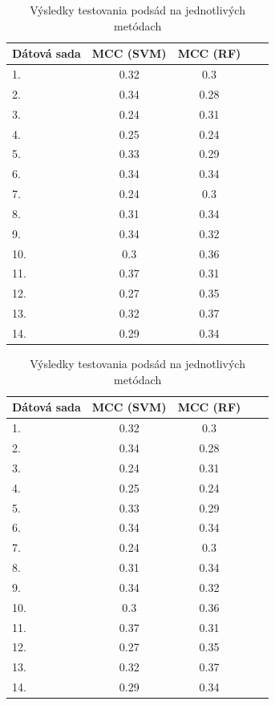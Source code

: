 \begin{table}[H]
	\centering
	\begin{tabular}{ |l | c | c | c | c|}
		\hline 
		Dátová sada  & MCC (SVM) & MCC (RF)  \\ \hline
		1. & 0.32 & 0.3\\ \hline
		2.  & 0.34 & 0.28\\ \hline
		3. & 0.24 & 0.31\\ \hline
		4.  & 0.25 & 0.24\\ \hline
		5.  & 0.33 & 0.29\\ \hline
		6.  & 0.34 & 0.34\\ \hline
		7. & 0.24 & 0.3\\ \hline
		8.  & 0.31 & 0.34\\ \hline
		9.  & 0.34 & 0.32\\ \hline
		10.  & 0.3 & 0.36\\ \hline
		11.  & 0.37 & 0.31\\ \hline
		12.  & 0.27 & 0.35\\ \hline
		13.  & 0.32 & 0.37\\ \hline
		14.  & 0.29 & 0.34\\ \hline
	\end{tabular}
	\caption {Výsledky testovania podsád na jednotlivých metódach} \label{pythontest} 
\end{table}

\begin{table}[H]
	\centering
	\begin{tabular}{ |l | c | c | c | c|}
		\hline 
		Dátová sada  & MCC (SVM) & MCC (RF)  \\ \hline
		1. & 0.32 & 0.3\\ \hline
		2.  & 0.34 & 0.28\\ \hline
		3. & 0.24 & 0.31\\ \hline
		4.  & 0.25 & 0.24\\ \hline
		5.  & 0.33 & 0.29\\ \hline
		6.  & 0.34 & 0.34\\ \hline
		7. & 0.24 & 0.3\\ \hline
		8.  & 0.31 & 0.34\\ \hline
		9.  & 0.34 & 0.32\\ \hline
		10.  & 0.3 & 0.36\\ \hline
		11.  & 0.37 & 0.31\\ \hline
		12.  & 0.27 & 0.35\\ \hline
		13.  & 0.32 & 0.37\\ \hline
		14.  & 0.29 & 0.34\\ \hline
	\end{tabular}
	\caption {Výsledky testovania podsád na jednotlivých metódach} \label{pythontest} 
\end{table}

